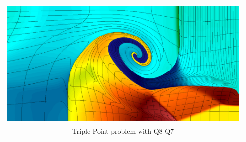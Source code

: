 \documentclass[8pt,xcolor=svgnames]{beamer}
\begin{document}
\begin{frame}
\begin{columns}
  \begin{column}{0.6\textwidth}
    \begin{center}
      \begin{minipage}{0.95\textwidth}
        \begin{alertblock}{}
          \begin{tabular}{c}
            \includegraphics[scale = 0.15]{figs/triple-point_BLAST_q8q7.png} \\
            {\tiny Triple-Point problem with Q8-Q7}
          \end{tabular}
        \end{alertblock}
      \end{minipage}
    \end{center}
  \end{column}
  \begin{column}{0.30\textwidth}
    \begin{center}
      \begin{minipage}{0.95\textwidth}
        \begin{alertblock}{}
          \begin{center}

\end{center}
\end{alertblock}
\end{minipage}
\end{center}
\end{column}
\end{columns}
\end{frame}
\end{document}
